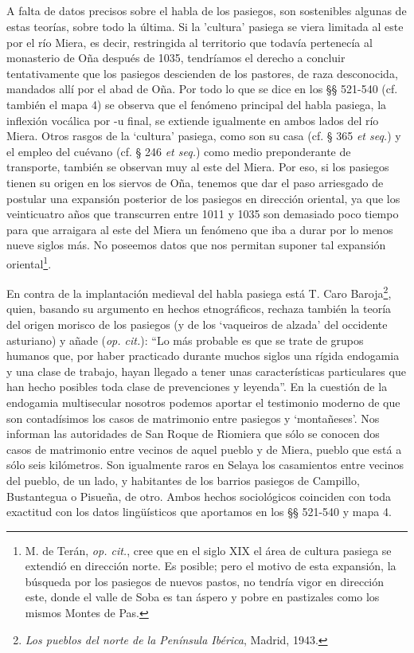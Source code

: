 \subsection{} A falta de datos precisos sobre el habla de los pasiegos, son sostenibles algunas de estas teorías, sobre todo la última. Si la 'cultura' pasiega se viera limitada al este por el río Miera, es decir, restringida al territorio que todavía pertenecía al monasterio de Oña después de 1035, tendríamos el derecho a concluir tentativamente que los pasiegos
descienden de los pastores, de raza desconocida, mandados allí por el abad de Oña. Por todo lo que se dice en los §§ 521-540 (cf. también el mapa 4) se observa que el fenómeno principal del habla pasiega, la inflexión vocálica por -u final, se extiende igualmente en ambos lados del río Miera. Otros rasgos de la `cultura' pasiega, como son su casa (cf. § 365 \emph{et seq.}) y el empleo del cuévano (cf. § 246 \emph{et seq.}) como medio preponderante de transporte, también se observan muy al este del Miera. Por eso, si los pasiegos tienen su origen en los siervos de Oña, tenemos que dar el paso arriesgado de postular una expansión posterior de los pasiegos en dirección oriental, ya que los veinticuatro años que transcurren entre 1011 y 1035 son demasiado poco tiempo para que arraigara al este del Miera un fenómeno que iba a durar por lo menos nueve siglos más. No poseemos datos que nos permitan suponer tal expansión oriental\footnote{M. de Terán, \emph{op. cit.}, cree que en el siglo XIX el área de cultura pasiega se extendió en dirección norte. Es posible; pero el motivo de esta expansión, la búsqueda por los pasiegos de nuevos pastos, no tendría vigor en dirección este, donde el valle de Soba es tan áspero y pobre en pastizales como los mismos Montes de Pas.}.


En contra de la implantación medieval del habla pasiega está T. Caro Baroja\footnote{\emph{Los pueblos del norte de la Península Ibérica}, Madrid, 1943.}, quien, basando su argumento en hechos etnográficos, rechaza también la teoría del origen morisco de los pasiegos (y de los  `vaqueiros de alzada' del occidente asturiano) y añade (\emph{op. cit.}): ``Lo más probable es que se trate de grupos humanos que, por haber practicado durante muchos siglos una rígida endogamia y una clase de trabajo, hayan llegado a tener unas características particulares que han hecho posibles toda clase de prevenciones y leyenda''. En la cuestión de la endogamia multisecular nosotros podemos aportar el testimonio moderno de que son contadísimos los casos de matrimonio entre pasiegos y `montañeses'. Nos informan las autoridades de San Roque de Riomiera que sólo se conocen dos casos de matrimonio entre vecinos de aquel pueblo y de Miera, pueblo que está a sólo seis kilómetros. Son igualmente raros en Selaya los casamientos entre vecinos del pueblo, de un lado, y habitantes de los barrios pasiegos de Campillo, Bustantegua o Pisueña, de otro. Ambos hechos sociológicos coinciden con toda exactitud con los datos lingüísticos que aportamos en los §§ 521-540 y mapa 4.

